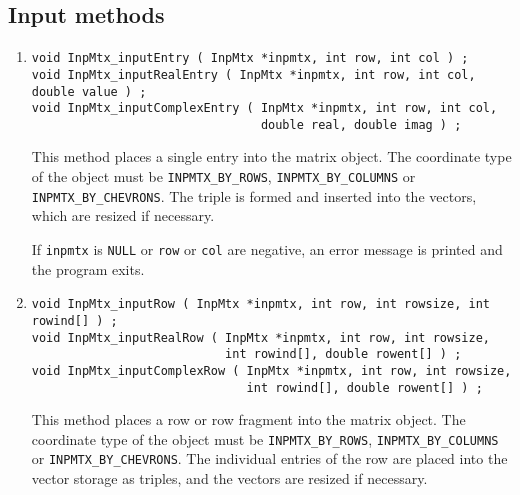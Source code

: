 \subsection{Input methods}
\label{subsection:InpMtx:proto:input}
\par
\begin{enumerate}
\item
\begin{verbatim}
void InpMtx_inputEntry ( InpMtx *inpmtx, int row, int col ) ;
void InpMtx_inputRealEntry ( InpMtx *inpmtx, int row, int col, double value ) ;
void InpMtx_inputComplexEntry ( InpMtx *inpmtx, int row, int col, 
                                double real, double imag ) ;
\end{verbatim}
This method places a single entry into the matrix object.
The coordinate type of the object must be 
{\tt INPMTX\_BY\_ROWS}, {\tt INPMTX\_BY\_COLUMNS} 
or {\tt INPMTX\_BY\_CHEVRONS}.
The triple is formed and inserted into the vectors, which are
resized if necessary.
\par {}
If {\tt inpmtx} is {\tt NULL} or {\tt row} or {\tt col} are negative,
an error message is printed and the program exits.
\item
\begin{verbatim}
void InpMtx_inputRow ( InpMtx *inpmtx, int row, int rowsize, int rowind[] ) ;
void InpMtx_inputRealRow ( InpMtx *inpmtx, int row, int rowsize, 
                           int rowind[], double rowent[] ) ;
void InpMtx_inputComplexRow ( InpMtx *inpmtx, int row, int rowsize, 
                              int rowind[], double rowent[] ) ;
\end{verbatim}
This method places a row or row fragment into the matrix object.
The coordinate type of the object must be 
{\tt INPMTX\_BY\_ROWS}, {\tt INPMTX\_BY\_COLUMNS} 
or {\tt INPMTX\_BY\_CHEVRONS}.
The individual entries of the row are placed into the vector
storage as triples, and the vectors are resized if necessary.
\par {}

\end{enumerate}
